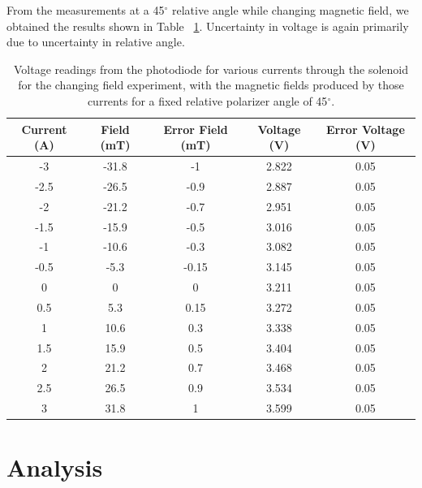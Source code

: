 \documentclass[prb,preprint]{revtex4-1}
\begin{document}
From the measurements at a 45$^{\circ}$ relative angle while changing magnetic field, we obtained the results shown in Table ~\ref{V_I_Table}. Uncertainty in voltage is again primarily due to uncertainty in relative angle.

\begin{table}[h!]
\centering
\caption{Voltage readings from the photodiode for various currents through the solenoid for the changing field experiment, with the magnetic fields produced by those currents for a fixed relative polarizer angle of 45$^{\circ}$.}
\begin{ruledtabular}
\begin{tabular}{c c c c c}
Current (A) & Field (mT) & Error Field (mT) & Voltage (V) & Error Voltage (V)\\
\hline	%
-3   & -31.8 & -1 & 2.822 & 0.05 \\
-2.5 & -26.5 & -0.9 & 2.887 & 0.05 \\
-2   & -21.2 & -0.7 & 2.951 & 0.05 \\
-1.5 & -15.9 & -0.5 & 3.016 & 0.05 \\
-1   & -10.6 & -0.3 & 3.082 & 0.05 \\
-0.5 & -5.3 & -0.15 & 3.145 & 0.05 \\
0 & 0 & 0 & 3.211 & 0.05 \\
0.5  & 5.3 & 0.15 & 3.272 & 0.05 \\
1    & 10.6 & 0.3 & 3.338 & 0.05 \\
1.5  & 15.9 & 0.5 & 3.404 & 0.05 \\
2    & 21.2 & 0.7 & 3.468 & 0.05 \\
2.5  & 26.5 & 0.9 & 3.534 & 0.05 \\
3    & 31.8 & 1 & 3.599 & 0.05
\end{tabular}
\end{ruledtabular}
\label{V_I_Table}
\end{table}


\section{Analysis}
\end{document}
